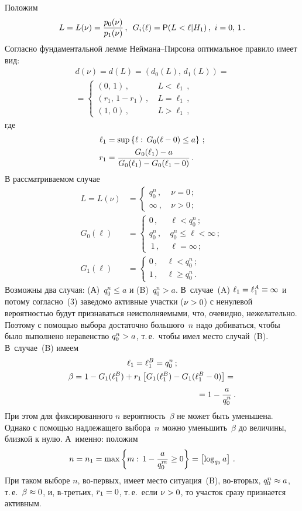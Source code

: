 \begin{multicols}{2}
Положим
$$
L=L(\nu)=\displaystyle\frac{\displaystyle p_0(\nu)\mathstrut}{\displaystyle p_1(\nu)\mathstrut}\,,\enskip G_i(\ell)={\sf
P}(L<\ell|H_1)\,,\ i=0,\,1\,.
$$
Согласно фундаментальной лемме Ней\-ма\-на--Пир\-со\-на оптимальное правило
имеет вид:
\begin{multline}
d(\nu)=d(L)=\left(d_0(L),\,d_1(L)\right)={}\\
{}=
\begin{cases}
(0,\,1)\,,&\ L<\ell_1\,,\\
(r_1,\,1-r_1)\,,&\ L=\ell_1\,,\\
(1,\,0)\,,&\ L>\ell_1\,,
\end{cases}
\label{e3-kor}
\end{multline}
где
\begin{align*}
\ell_1&=\sup\left\{\ell:\,G_0(\ell-0)\le a\right\}\,;\\
r_1&=\displaystyle\frac{\displaystyle G_0(\ell_1)-a\mathstrut}{\displaystyle G_0(\ell_1)-G_0(\ell_1-0)\mathstrut}\,.
\end{align*}
В рассматриваемом случае
\begin{align*}
L=L(\nu)&=
\begin{cases}
q_0^n\,,&\ \nu=0\,;\\
\infty\ ,&\ \nu>0\,;
\end{cases}\\
G_0(\ell)&=
\begin{cases}
0\,,&\ \ell<q_0^n\,;\\
q_0^n\,,&\ q_0^n\le\ell<\infty\,;\\\
1\,,&\ \ell=\infty\,;
\end{cases}\\
G_1(\ell)&=
\begin{cases}0\,,&\ \ell<q_0^n\,;\\
1\,,&\ \ell\ge q_0^n\,.
\end{cases}
\end{align*}
Возможны два случая: (А)~$q_0^n\le a$ и (B)~$q_0^n> a$. В~случае~(A)
$\ell_1\hm=\ell_1^A\hm\equiv\infty$ и потому согласно~(3) заведомо
активные участки ($\nu\hm>0$) с ненулевой вероятностью будут
признаваться неисполняемыми, что, очевидно, нежелательно. Поэтому с
помощью выбора достаточно большого~$n$ надо добиваться, чтобы было
выполнено неравенство $q_0^n\hm> a$, т.\,е.\ чтобы имел место случай~(B).
В~случае~(B) имеем 
\begin{gather*}
\ell_1=\ell_1^B=q_0^n\,;
\\
\beta=1-G_1(\ell_1^B)+r_1\left[G_1(\ell_1^B)-G_1(\ell_1^B-0)\right]={}\\
\hspace*{55mm}{}=1-\fr{a}{q_0^n}\,.
\end{gather*}
При этом для фиксированного $n$ вероятность~$\beta$ не может быть
уменьшена. Однако с помощью надлежащего выбора~$n$ можно уменьшить~$\beta$ 
до величины, близкой к нулю. А~именно: положим
$$
n=n_1=\max\left\{m:\,1-\displaystyle\frac{\displaystyle a\mathstrut}{\displaystyle q_0^m\mathstrut}\ge0\right\}=\left[\log_{q_0}a\right]\,.
$$
При таком выборе $n$, во-пер\-вых, имеет место ситуация~(B),
во-вто\-рых, $q_0^n\hm\approx a$, т.\,е.\ $\beta\hm\approx0$, и, в-третьих,
$r_1\hm=0$, т.\,е.\ если $\nu\hm>0$, то участок сразу признается активным.


\end{multicols}
